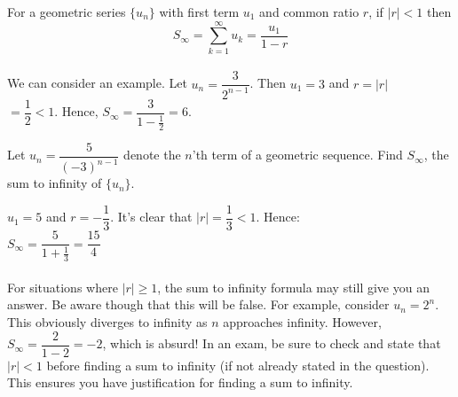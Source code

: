 \documentclass[12pt, a4paper, titlepage, twoside]{article}
\newcounter{excount}[subsection]
\begin{document}
	\begin{kp}
		For a geometric series $\{u_n\}$ with first term $u_1$ and common ratio $r$, if $|r| < 1$ then 
		$$S_{\infty} = \displaystyle \sum_{k=1}^\infty u_k = \dfrac{u_1}{1-r}$$
	\end{kp}
	
	\paragraph{}
	We can consider an example. Let $u_n = \dfrac{3}{2^{n-1}}$. Then $u_1 = 3$ and $r = |r|$\\ $=\dfrac{1}{2} < 1$. Hence,
	$S_{\infty} = \dfrac{3}{1-\frac{1}{2}} = 6$.\\
	
	\begin{ex}
		Let $u_n = \dfrac{5}{(-3)^{n-1}}$ denote the $n$'th term of a geometric sequence. Find $S_\infty$, the sum to infinity of 
		$\{u_n\}$.
		
		\hfill
		\tcbline
		\hfill
		
		$u_1 = 5$ and $r = -\dfrac{1}{3}$. It's clear that $|r| = \dfrac{1}{3} < 1$. Hence:\\
		
		$S_\infty = \dfrac{5}{1+\frac{1}{3}} = \dfrac{15}{4}$
	\end{ex}
	
	\paragraph{}
	For situations where $|r| \geq 1$, the sum to infinity formula may still give you an answer. Be aware though that this will be false.
	For example, consider $u_n = 2^n$. This obviously diverges to infinity as $n$ approaches infinity. However, $S_\infty = 
	\dfrac{2}{1-2} = -2$, which is absurd! In an exam, be sure to check and state that $|r| < 1$ before finding a sum to infinity (if not 
	already stated in the question). This ensures you have justification for finding a sum to infinity.\\
	
\end{document}
